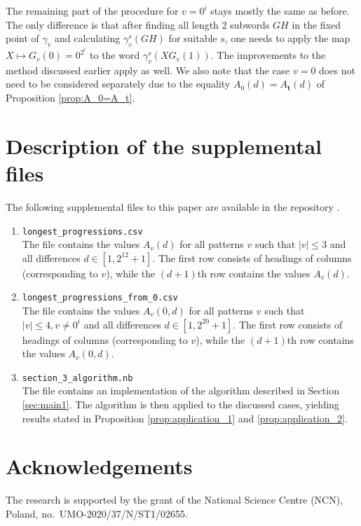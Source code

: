 \documentclass[a4paper,11pt]{amsart}
\theoremstyle{definition}
\begin{document}
The remaining part of the procedure for $v=0^{i}$ stays mostly the same as before. The only difference is that after finding all length $2$ subwords $GH$ in the fixed point of $\gamma_v$ and calculating $\gamma_v^s(GH)$ for suitable $s$, one needs to apply the map $X \mapsto G_v(0) = 0^{2^i}$ to the word $\gamma_v^s(X G_v(1))$. The improvements to the method discussed earlier apply as well. We also note that the case $v=0$ does not need to be considered separately due to the equality $A_{0}(d) = A_{\mathbf{t}}(d)$ of Proposition \ref{prop:A_0=A_t}.


\section{Description of the supplemental files}  \label{sec:supplemental}
The following supplemental files to this paper are available in the repository \cite{Git}.
\begin{enumerate}
\item \texttt{longest\_progressions.csv} \\
The file contains the values $A_v(d)$ for all patterns $v$ such that $|v| \leq 3$ and all differences $d \in [1,2^{12}+1]$. The first row consists of headings of columns (corresponding to $v$), while the $(d+1)$th row contains the values $A_v(d)$.
\item \texttt{longest\_progressions\_from\_0.csv} \\
The file contains the values $A_v(0,d)$ for all patterns $v$ such that $|v| \leq 4, v \neq 0^i$ and all differences $d \in [1,2^{20}+1]$. The first row consists of headings of columns (corresponding to $v$), while the $(d+1)$th row contains the values $A_v(0,d)$.
\item \texttt{section\_3\_algorithm.nb} \\
The file contains an implementation of the algorithm described in Section \ref{sec:main1}. The algorithm is then applied to the discussed cases, yielding results stated in Proposition \ref{prop:application_1} and \ref{prop:application_2}.
\end{enumerate}


\section*{Acknowledgements}
The research is supported by the grant of the National Science Centre (NCN), Poland, no.\ UMO-2020/37/N/ST1/02655.




\end{document}
